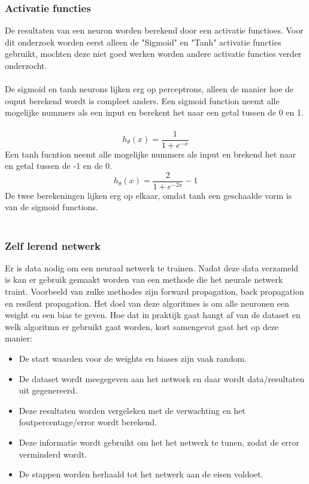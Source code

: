 \subsubsection{Activatie functies}
De resultaten van een neuron worden berekend door een activatie functioes. Voor dit onderzoek worden eerst alleen de "Sigmoid" en "Tanh" activatie functies gebruikt, mochten deze niet goed werken worden andere activatie functies verder onderzocht. \\\\
De sigmoid en tanh neurons lijken erg op perceptrons, alleen de manier hoe de ouput berekend wordt is compleet anders. Een sigmoid function neemt alle mogelijke nummers als een input en berekent het naar een getal tussen de 0 en 1.\\\\
\begin{equation}
    h_ \theta (x) =  \frac{\mathrm{1} }{\mathrm{1} + e^{-x} }  \label{sigmoid}
  \end{equation}
Een tanh fucntion neemt alle mogelijke nummers als input en brekend het naar en getal tussen de -1 en de 0.\\
\begin{equation}
    h_ \theta (x) =  \frac{\mathrm{2} }{\mathrm{1} + e^{-2x} } -1 \label{tanh}
  \end{equation}
De twee berekeningen lijken erg op elkaar, omdat tanh een geschaalde vorm is van de sigmoid functions.\\\\ %

\subsubsection{Zelf lerend netwerk}
Er is data nodig om een neuraal netwerk te trainen. Nadat deze data verzameld is kan er gebruik gemaakt worden van een methode die het neurale netwerk traint. Voorbeeld van zulke methodes zijn forward propagation, back propagation en resilent propagation. Het doel van deze algoritmes is om alle neuronen een weight en een bias te geven. Hoe dat in praktijk gaat hangt af van de dataset en welk algoritmn er gebruikt gaat worden, kort samengevat gaat het op deze manier:
\begin{itemize}
\item De start waarden voor de weights en biases zijn vaak random.
\item De dataset wordt meegegeven aan het network en daar wordt data/resultaten uit gegenereerd.
\item Deze resultaten worden vergeleken met de verwachting en het foutpercentage/error wordt berekend.
\item Deze informatie wordt gebruikt om het het netwerk te tunen, zodat de error verminderd wordt.
\item De stappen worden herhaald tot het netwerk aan de eisen voldoet.
\end{itemize}\cite{learning}

